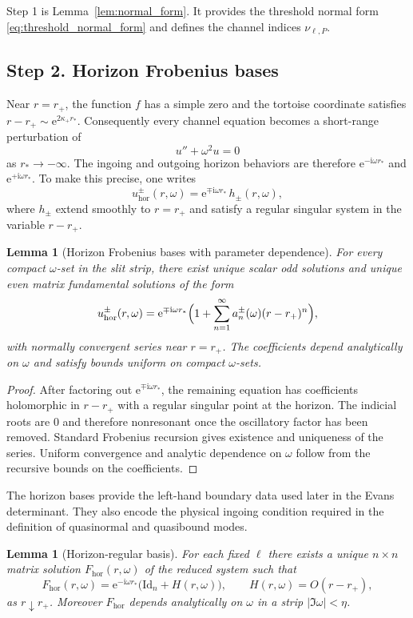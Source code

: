 \documentclass[12pt]{article}
\numberwithin{equation}{section}
\theoremstyle{plain}
\newtheorem{lemma}[theorem]{Lemma}
\theoremstyle{definition}
\theoremstyle{remark}
\newcommand{\ii}{\mathrm i}
\newcommand{\ee}{\mathrm e}
\newcommand{\hor}{\mathrm{hor}}
\newcommand{\om}{\omega}
\newcommand{\abs}[1]{\left|#1\right|}
\newcommand{\Id}{\mathrm{Id}}
\begin{document}
Step 1 is Lemma~\ref{lem:normal_form}.  It provides the threshold normal form \eqref{eq:threshold_normal_form} and defines the channel indices $\nu_{\ell,P}$.

\subsection*{Step 2. Horizon Frobenius bases}

Near $r=r_+$, the function $f$ has a simple zero and the tortoise coordinate satisfies $r-r_+\sim \ee^{2\kappa_+ r_*}$.  Consequently every channel equation becomes a short-range perturbation of
\[
   u''+\om^2u=0
\]
as $r_*\to-\infty$.  The ingoing and outgoing horizon behaviors are therefore $\ee^{-\ii\om r_*}$ and $\ee^{+\ii\om r_*}$.  To make this precise, one writes
\[
   u_{\hor}^\pm(r,\om)=\ee^{\mp \ii\om r_*}\,h_\pm(r,\om),
\]
where $h_\pm$ extend smoothly to $r=r_+$ and satisfy a regular singular system in the variable $r-r_+$.

\begin{lemma}[Horizon Frobenius bases with parameter dependence]\label{lem:horizon_frobenius}
For every compact $\om$-set in the slit strip, there exist unique scalar odd solutions and unique even matrix fundamental solutions of the form
\[
   u_{\hor}^\pm(r,\om)=\ee^{\mp\ii\om r_*}\Bigl(1+\sum_{n=1}^\infty a_n^\pm(\om)(r-r_+)^n\Bigr),
\]
with normally convergent series near $r=r_+$.  The coefficients depend analytically on $\om$ and satisfy bounds uniform on compact $\om$-sets.
\end{lemma}

\begin{proof}
After factoring out $\ee^{\mp\ii\om r_*}$, the remaining equation has coefficients holomorphic in $r-r_+$ with a regular singular point at the horizon.  The indicial roots are $0$ and therefore nonresonant once the oscillatory factor has been removed.  Standard Frobenius recursion gives existence and uniqueness of the series.  Uniform convergence and analytic dependence on $\om$ follow from the recursive bounds on the coefficients.
\end{proof}

The horizon bases provide the left-hand boundary data used later in the Evans determinant.  They also encode the physical ingoing condition required in the definition of quasinormal and quasibound modes.


\begin{lemma}[Horizon-regular basis]\label{lem:horizon_basis}
For each fixed $\ell$ there exists a unique $n\times n$ matrix solution $F_{\hor}(r,\om)$ of the reduced system such that
\begin{equation}\label{eq:horizon_basis}
   F_{\hor}(r,\om)
   =
   \ee^{-\ii\om r_*}\bigl(\Id_n+H(r,\om)\bigr),
   \qquad
   H(r,\om)=O(r-r_+),
\end{equation}
as $r\downarrow r_+$.  Moreover $F_{\hor}$ depends analytically on $\om$ in a strip $\abs{\Im\om}<\eta$.
\end{lemma}
\end{document}
